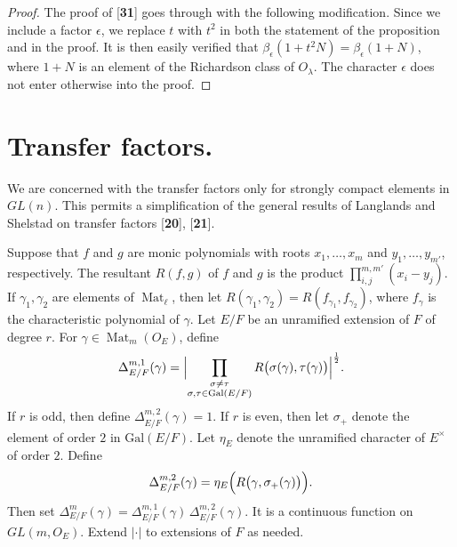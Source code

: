 \documentclass{amsart}
\begin{document}
\begin{proof}
The proof of  [{\bf 31}] goes through with the following
  modification.
Since we include a factor
  $ \epsilon $, 
we replace $t$ with $t^2$ in both the statement of the 
  proposition and in the proof.
It is then easily verified that
  $ \beta_{\epsilon} (1 + t^2 N) = 
    \beta_{\epsilon} (1 + N) $, where
  $ 1 + N $ is
an element of the Richardson class of 
  $ O_{\lambda} $.
The character 
  $ \epsilon $
does not enter otherwise into the proof.
\end{proof}

\section{{Transfer factors.}}

\medskip
\noindent
We are concerned with the transfer factors only for strongly compact
  elements in
  $ GL (n) $.
This permits a simplification of the general results of
  Langlands and Shelstad on transfer factors [{\bf 20}], [{\bf 21}].

Suppose that $f$ and $g$ are monic polynomials with roots
  $ x_1, \dots , x_m $ 
and
  $ y_1, \dots , y_{m'} $,
respectively.
The resultant
  $ R(f,g) $
of $f$ and $g$ is the product
  $ \prod_{i,j}^{m,m'} (x_i-y_j) $.
If
  $ \gamma_1, \gamma_2 $
are elements of 
  $ \operatorname{Mat}_{\ell} $, then
let
  $ R (\gamma_1, \gamma_2) =
    R (f_{\gamma_1}, f_{\gamma_2} ) $,
where 
  $ f_{\gamma} $
is the characteristic polynomial of 
  $ \gamma $.
Let 
  $ E / F $ 
be an unramified extension of $F$ of degree $r$.
For
  $ \gamma \in \operatorname{Mat}_m (O_E) $,
define
%
$$  
  \Delta_{E/F}^{m,1} (\gamma) =
    \Bigl|
      \prod_{\substack{
         \sigma \neq \tau \\
         \sigma, \tau \in \text{Gal} (E/F)
       }}
       R 
       \bigl(
          \sigma (\gamma), \tau (\gamma)
       \bigr)
    \Bigr|^{\frac12} .
$$
%
If $r$ is odd, then define
  $ \Delta_{E/F}^{m,2} (\gamma) = 1 $.
If $r$ is even,  then let
  $ \sigma_+ $
denote the element of order $2$ in 
  $ \text{Gal} (E/F) $.
Let
  $ \eta_E $
denote the unramified character of
  $ E^{\times} $ 
of order $2$.
Define
  $$ \Delta_{E/F}^{m,2}
    (\gamma) =
    \eta_E
    \Bigl(
      R 
      \bigl(
        \gamma,\sigma_+ (\gamma) 
      \bigr)
     \Bigr) .$$
Then set
  $ \Delta_{E/F}^m (\gamma) = 
    \Delta_{E/F}^{m, 1} (\gamma) \,
    \Delta_{E/F}^{m,2} (\gamma) $.
It is a continuous function on
  $ GL(m, O_E) $.
Extend
  $ | \cdot | $
to extensions of $F$ as needed.
\end{document}
